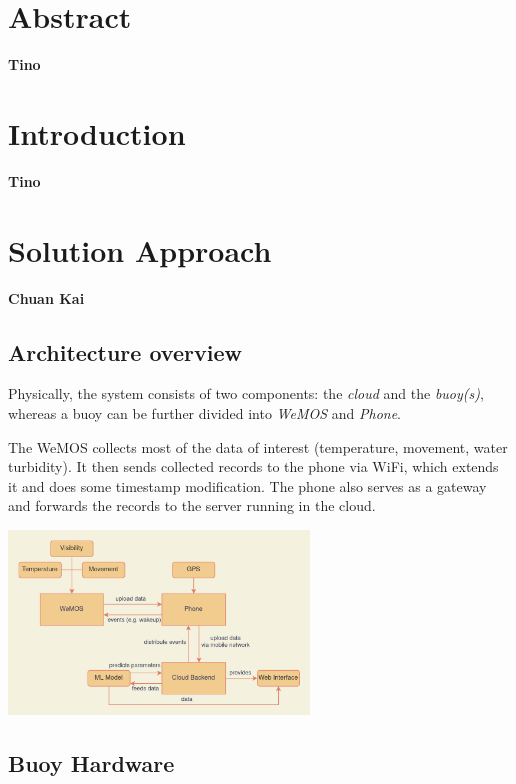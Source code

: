 \documentclass{article}
\begin{document}
\section{Abstract}

\textbf{Tino}

\section{Introduction}

\textbf{Tino}

\section{Solution Approach}

\textbf{Chuan Kai}

\subsection{Architecture overview}

\begin{multicols}{2}

Physically, the system consists of two components: the \textit{cloud} and the \textit{buoy(s)}, whereas a buoy can be further divided into \textit{WeMOS} and \textit{Phone}. 

The WeMOS collects most of the data of interest (temperature, movement, water turbidity). It then sends collected records to the phone via WiFi, which extends it and does some timestamp modification. The phone also serves as a gateway and forwards the records to the server running in the cloud.

\includegraphics[width=8cm]{report/resources/architecture.png}

\end{multicols}

\subsection{Buoy Hardware}
\end{document}
